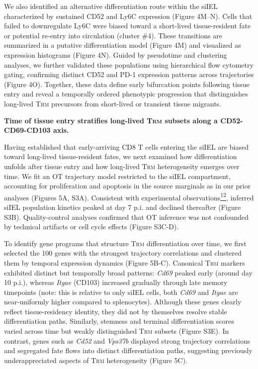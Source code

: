 We also identified an alternative differentiation route within the siIEL
characterized by sustained CD52 and Ly6C expression (Figure 4M--N).
Cells that failed to downregulate Ly6C were biased toward a short-lived
tissue-resident fate or potential re-entry into circulation (cluster
\#4). These transitions are summarized in a putative differentiation
model (Figure 4M) and visualized as expression histograms (Figure 4N).
Guided by pseudotime and clustering analyses, we further validated these
populations using hierarchical flow cytometry gating, confirming
distinct CD52 and PD-1 expression patterns across trajectories (Figure
4O). Together, these data define early bifurcation points following
tissue entry and reveal a temporally ordered phenotypic progression that
distinguishes long-lived T\textsc{rm} precursors from short-lived or
transient tissue migrants.

\textbf{Time of tissue entry stratifies long-lived T\textsc{rm} subsets
along a CD52-CD69-CD103 axis.}

Having established that early-arriving CD8 T cells entering the siIEL
are biased toward long-lived tissue-resident fates, we next examined how
differentiation unfolds after tissue entry and how long-lived
T\textsc{rm} heterogeneity emerges over time. We fit an OT trajectory
model restricted to the siIEL compartment, accounting for proliferation
and apoptosis in the source marginals as in our prior analyses (Figures
5A, S3A). Consistent with experimental
observations\href{https://sciwheel.com/work/citation?ids=8940021\&pre=\&suf=\&sa=0\&dbf=0}{\textsuperscript{12}},
inferred siIEL population kinetics peaked at day 7 p.i. and declined
thereafter (Figure S3B). Quality-control analyses confirmed that OT
inference was not confounded by technical artifacts or cell cycle
effects (Figure S3C-D).

To identify gene programs that structure T\textsc{rm} differentiation
over time, we first selected the 100 genes with the strongest trajectory
correlations and clustered them by temporal expression dynamics (Figure
5B-C). Canonical T\textsc{rm} markers exhibited distinct but temporally
broad patterns: \emph{Cd69} peaked early (around day 10 p.i.), whereas
\emph{Itgae} (CD103) increased gradually through late memory timepoints
(note: this is relative to only siIEL cells, both \emph{Cd69} and
\emph{Itgae} are near-uniformly higher compared to splenocytes).
Although these genes clearly reflect tissue-residency identity, they did
not by themselves resolve stable differentiation paths. Similarly,
stemness and terminal differentiation scores varied across time but
weakly distinguished T\textsc{rm} subsets (Figure S3E). In contrast,
genes such as \emph{Cd52} and \emph{Vps37b} displayed strong trajectory
correlations and segregated fate flows into distinct differentiation
paths, suggesting previously underappreciated aspects of T\textsc{rm}
heterogeneity (Figure 5C).

